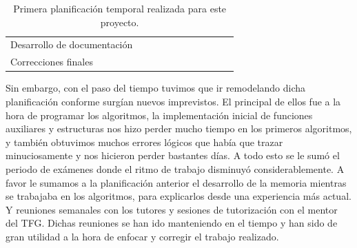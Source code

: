 \documentclass[oneside,openright,titlepage,numbers=noenddot,openany,headinclude,footinclude=true,
cleardoublepage=empty,abstractoff,BCOR=5mm,paper=a4,fontsize=12pt,main=spanish]{scrreprt}
\begin{document}
\begin{table}[H]
{\begin{tabular}{l|c|cccccclll}
Desarrollo de documentación                       & \multicolumn{1}{l|}{}    & \multicolumn{1}{l}{}     & \multicolumn{1}{l}{}     & \multicolumn{1}{l}{}     & \multicolumn{1}{l}{}     & \multicolumn{1}{l}{}     & \multicolumn{1}{l}{}     &                                              &                                              & \multicolumn{1}{c}{\cellcolor[HTML]{34FF34}} \\
Correcciones finales                              & \multicolumn{1}{l|}{}    & \multicolumn{1}{l}{}     & \multicolumn{1}{l}{}     & \multicolumn{1}{l}{}     & \multicolumn{1}{l}{}     & \multicolumn{1}{l}{}     & \multicolumn{1}{l}{}     &                                              &                                              & \multicolumn{1}{c}{\cellcolor[HTML]{34FF34}}
\end{tabular}
}
\caption{Primera planificación temporal realizada para este proyecto.}
\label{tab:planific1}
\end{table}


Sin embargo, con el paso del tiempo tuvimos que ir remodelando dicha planificación conforme surgían nuevos imprevistos. El principal de ellos fue a la hora de programar los algoritmos, la implementación inicial de funciones auxiliares y estructuras nos hizo perder mucho tiempo en los primeros algoritmos, y también obtuvimos muchos errores lógicos que había que trazar minuciosamente y nos hicieron perder bastantes días. A todo esto se le sumó el periodo de exámenes donde el ritmo de trabajo disminuyó considerablemente. A favor le sumamos a la planificación anterior el desarrollo de la memoria mientras se trabajaba en los algoritmos, para explicarlos desde una experiencia más actual. Y reuniones semanales con los tutores y sesiones de tutorización con el mentor del TFG. Dichas reuniones se han ido manteniendo en el tiempo y han sido de gran utilidad a la hora de enfocar y corregir el trabajo realizado.
\end{document}
